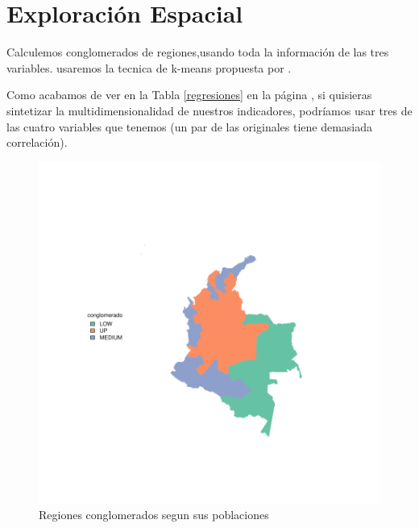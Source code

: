 \documentclass{article}
\begin{document}
\clearpage
\section{Exploración Espacial}
Calculemos conglomerados de regiones,usando toda la información de las tres variables. usaremos la tecnica de k-means propuesta por \cite{reynolds_clustering_2006}.

 
Como acabamos de ver en la Tabla \ref{regresiones} en la página \pageref{regresiones}, si quisieras sintetizar la multidimensionalidad de nuestros indicadores, podríamos usar tres de las cuatro variables que tenemos (un par de las originales tiene demasiada correlación). 
% 
% 
% 
% 
%
\begin{figure}[h]
\centering
\includegraphics{ProyectoHC-plotMap1}
\caption{Regiones conglomerados segun sus poblaciones}\label{clustmap}
\end{figure}
% 

\renewcommand{\refname}{Bibliografía}

%
\end{document}
